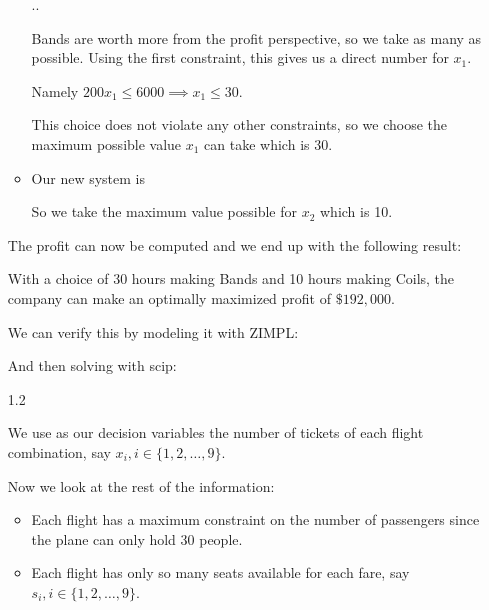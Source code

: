 \documentclass[12pt,letterpaper]{article}
\begin{document}
\begin{enumerate}
\begin{itemize}
          \sysdelim..

          Bands are worth more from the profit perspective, so we take as many as possible.
          Using the first constraint, this gives us a direct number for $x_1$.

          Namely $200 x_1 \leq 6000 \implies x_1 \leq 30$.

          This choice does not violate any other constraints,
          so we choose the maximum possible value $x_1$ can take which is 30.

        \item
          Our new system is


          So we take the maximum value possible for $x_2$ which is 10.
      \end{itemize}

      The profit can now be computed and we end up with the following result:

      With a choice of 30 hours making Bands and 10 hours making Coils,
      the company can make an optimally maximized profit of $\$192,000$.

      We can verify this by modeling it with ZIMPL:

      

      And then solving with scip:

      

    \item [1.2]

      We use as our decision variables the number of tickets of each flight combination, say $x_i, i \in \{1, 2, \dots, 9\}$.

      Now we look at the rest of the information:

      \begin{itemize}
        \item
          Each flight has a maximum constraint on the number of passengers since the plane can only hold 30 people.

        \item
          Each flight has only so many seats available for each fare,
          say $s_i, i \in \{1, 2, \dots, 9\}$.


\end{itemize}
\end{enumerate}
\end{document}
